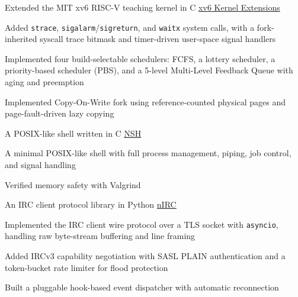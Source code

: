 
\begin{cventries}

  \cventry
    {Extended the MIT xv6 RISC-V teaching kernel in C} %
    {\href{https://github.com/necessary129/osn-xv6}{xv6 Kernel Extensions}} %
    {} %
    {} %
    {
      \begin{cvitems} %
        \item {Added \texttt{strace}, \texttt{sigalarm}/\texttt{sigreturn}, and \texttt{waitx} system calls, with a fork-inherited syscall trace bitmask and timer-driven user-space signal handlers}
        \item {Implemented four build-selectable schedulers: FCFS, a lottery scheduler, a priority-based scheduler (PBS), and a 5-level Multi-Level Feedback Queue with aging and preemption}
        \item {Implemented Copy-On-Write fork using reference-counted physical pages and page-fault-driven lazy copying}
      \end{cvitems}
    }

  \cventry
    {A POSIX-like shell written in C} %
    {\href{https://github.com/necessary129/nsh}{NSH}} %
    {} %
    {} %
    {
      \begin{cvitems} %
        \item {A minimal POSIX-like shell with full process management, piping, job control, and signal handling}
        \item {Verified memory safety with Valgrind}
      \end{cvitems}
    }

  \cventry
    {An IRC client protocol library in Python} %
    {\href{https://github.com/necessary129/nIRC}{nIRC}} %
    {} %
    {} %
    {
      \begin{cvitems} %
        \item {Implemented the IRC client wire protocol over a TLS socket with \texttt{asyncio}, handling raw byte-stream buffering and line framing}
        \item {Added IRCv3 capability negotiation with SASL PLAIN authentication and a token-bucket rate limiter for flood protection}
        \item {Built a pluggable hook-based event dispatcher with automatic reconnection}
      \end{cvitems}
    }


\end{cventries}
